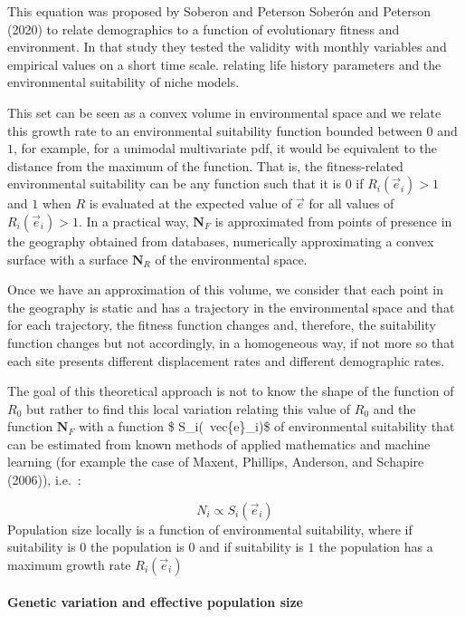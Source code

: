 \documentclass[
]{article}
\begin{document}
This equation was proposed by Soberon and Peterson Soberón and Peterson
(2020) to relate demographics to a function of evolutionary fitness and
environment. In that study they tested the validity with monthly
variables and empirical values on a short time scale. relating life
history parameters and the environmental suitability of niche models.

This set can be seen as a convex volume in environmental space and we
relate this growth rate to an environmental suitability function bounded
between \(0\) and \(1\), for example, for a unimodal multivariate pdf,
it would be equivalent to the distance from the maximum of the function.
That is, the fitness-related environmental suitability can be any
function such that it is \(0\) if \(R_i(\vec{e}_i) > 1\) and \(1\) when
\(R\) is evaluated at the expected value of \(\vec {e}\) for all values
of \(R_i(\vec{e}_i) > 1\). In a practical way, \(\mathbf{N}_F\) is
approximated from points of presence in the geography obtained from
databases, numerically approximating a convex surface with a surface
\(\mathbf{N}_R\) of the environmental space.

Once we have an approximation of this volume, we consider that each
point in the geography is static and has a trajectory in the
environmental space and that for each trajectory, the fitness function
changes and, therefore, the suitability function changes but not
accordingly, in a homogeneous way, if not more so that each site
presents different displacement rates and different demographic rates.

The goal of this theoretical approach is not to know the shape of the
function of \(R_0\) but rather to find this local variation relating
this value of \(R_0\) and the function \(\mathbf{N}_F\) with a function
\$ S\_i(~vec\{e\}\_i)\$ of environmental suitability that can be
estimated from known methods of applied mathematics and machine learning
(for example the case of Maxent, Phillips, Anderson, and Schapire
(2006)), i.e.~:

\[
N_i \propto  S_i(\vec{e}_i)
\] Population size locally is a function of environmental suitability,
where if suitability is \(0\) the population is \(0\) and if suitability
is \(1\) the population has a maximum growth rate \(R_i(\vec{e}_i)\)

\hypertarget{genetic-variation-and-effective-population-size}{%
\paragraph{Genetic variation and effective population
size}\label{genetic-variation-and-effective-population-size}}
\end{document}
